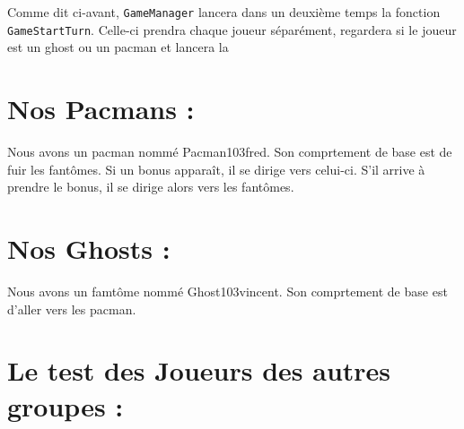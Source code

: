 \documentclass[a4paper, 11pt]{article}
\begin{document}
Comme dit ci-avant, \texttt{GameManager} lancera dans un deuxième temps la fonction \texttt{GameStartTurn}.  Celle-ci prendra chaque joueur séparément, regardera si le joueur est un ghost ou un pacman et lancera la 

\section{Nos Pacmans :}

Nous avons un pacman nommé Pacman103fred. Son comprtement de base est de fuir les fantômes. Si un bonus apparaît, il se dirige vers celui-ci. S'il arrive à prendre le bonus, il se dirige alors vers les fantômes.

\section{Nos Ghosts :}

Nous avons un famtôme nommé Ghost103vincent. Son comprtement de base est d'aller vers les pacman.

\section{Le test des Joueurs des autres groupes :}
\end{document}
